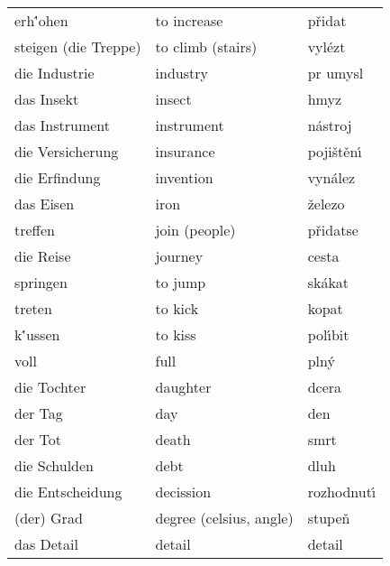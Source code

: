 \documentclass[11pt]{article}
\begin{document}
\begin{longtable}{lll}
 erh\''ohen                       &  to increase              &  p\v ridat           \\
 steigen (die Treppe)             &  to climb (stairs)        &  vyl\'ezt            \\
 die Industrie                    &  industry                 &  pr\accent23 umysl   \\
 das Insekt                       &  insect                   &  hmyz                \\
 das Instrument                   &  instrument               &  n\'astroj           \\
 die Versicherung                 &  insurance                &  poji\v st\v en\'\i  \\
 die Erfindung                    &  invention                &  vyn\'alez           \\
 das Eisen                        &  iron                     &  \v zelezo           \\
 treffen                          &  join (people)            &  p\v ridatse         \\
 die Reise                        &  journey                  &  cesta               \\
 springen                         &  to jump                  &  sk\'akat            \\
 treten                           &  to kick                  &  kopat               \\
 k\''ussen                        &  to kiss                  &  pol\'\i bit         \\
 voll                             &  full                     &  pln\'y              \\
 die Tochter                      &  daughter                 &  dcera               \\
 der Tag                          &  day                      &  den                 \\
 der Tot                          &  death                    &  smrt                \\
 die Schulden                     &  debt                     &  dluh                \\
 die Entscheidung                 &  decission                &  rozhodnut\'\i       \\
 (der) Grad                       &  degree (celsius, angle)  &  stupe\v n           \\
 das Detail                       &  detail                   &  detail              \\

\end{longtable}
\end{document}
